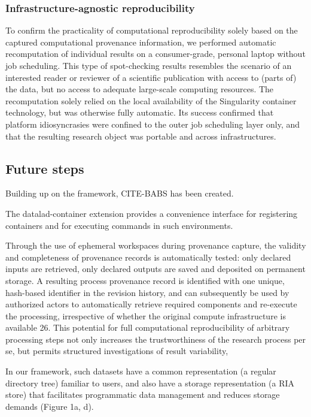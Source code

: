 \subsubsection{Infrastructure-agnostic reproducibility}

To confirm the practicality of computational reproducibility solely based on the captured computational provenance information, we performed automatic recomputation of individual results on a consumer-grade, personal laptop without job scheduling.
This type of spot-checking results resembles the scenario of an interested reader or reviewer of a scientific publication with access to (parts of) the data, but no access to adequate large-scale computing resources.
The recomputation solely relied on the local availability of the Singularity container technology, but was otherwise fully automatic.
Its success confirmed that platform idiosyncrasies were confined to the outer job scheduling layer only, and that the resulting research object was portable and across infrastructures.


\subsection{Future steps}


Building up on the framework, CITE-BABS has been created.


The datalad-container extension provides a convenience interface for registering containers and for executing commands in such environments.



Through the use of ephemeral workspaces during provenance capture, the validity and completeness of provenance records is automatically tested: only declared inputs are retrieved, only declared outputs are saved and deposited on permanent storage.
A resulting process provenance record is identified with one unique, hash-based identifier in the revision history, and can subsequently be used by authorized actors to automatically retrieve required components and re-execute the processing, irrespective of whether the original compute infrastructure is available 26. This potential for full computational reproducibility of arbitrary processing steps not only increases the trustworthiness of the research process per se, but permits structured investigations of result variability,

In our framework, such datasets have a common representation (a regular directory tree) familiar to users, and also have a storage representation (a RIA store) that facilitates programmatic data management and reduces storage demands (Figure 1a, d).

